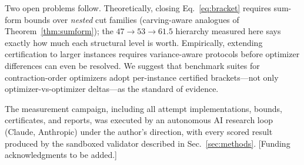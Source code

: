 \documentclass[a4paper,11pt,noarxiv]{quantumarticle}
\begin{document}
Two open problems follow. Theoretically, closing Eq.~\eqref{eq:bracket}
requires sum-form bounds over \emph{nested} cut families (carving-aware
analogues of Theorem~\ref{thm:sumform}); the $47 \to 53 \to 61.5$ hierarchy
measured here says exactly how much each structural level is worth.
Empirically, extending certification to larger instances requires
variance-aware protocols before optimizer differences can even be resolved.
We suggest that benchmark suites for contraction-order optimizers adopt
per-instance certified brackets---not only optimizer-vs-optimizer
deltas---as the standard of evidence.

\begin{acknowledgments}
The measurement campaign, including all attempt implementations, bounds,
certificates, and reports, was executed by an autonomous AI research loop
(Claude, Anthropic) under the author's direction, with every scored result
produced by the sandboxed validator described in Sec.~\ref{sec:methods}.
[Funding acknowledgments to be added.]
\end{acknowledgments}



\end{document}
